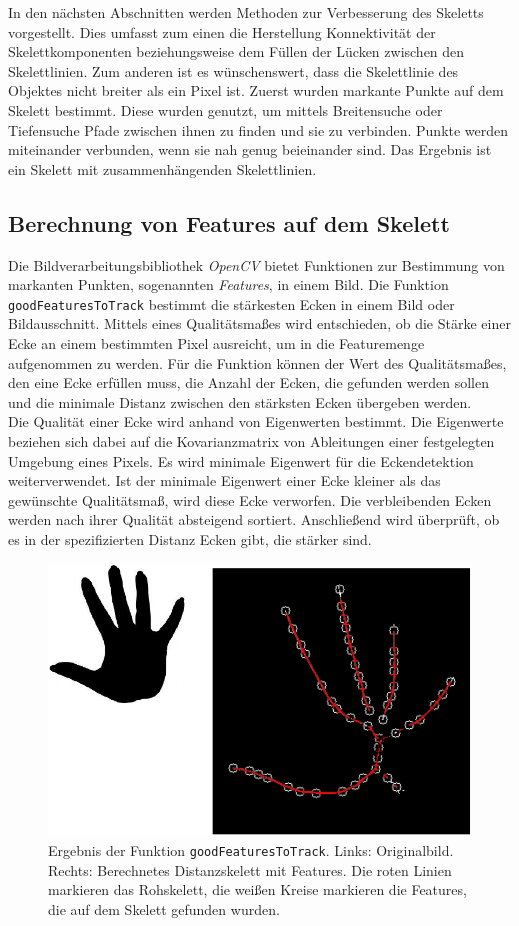 In den nächsten Abschnitten werden Methoden zur Verbesserung des Skeletts vorgestellt. Dies umfasst zum einen die Herstellung Konnektivität der Skelettkomponenten beziehungsweise dem Füllen der Lücken zwischen den Skelettlinien. Zum anderen ist es wünschenswert, dass die Skelettlinie des Objektes nicht breiter als ein Pixel ist. Zuerst wurden markante Punkte auf dem Skelett bestimmt. Diese wurden
genutzt, um mittels Breitensuche oder Tiefensuche Pfade zwischen ihnen zu finden und sie zu verbinden. Punkte werden miteinander
verbunden, wenn sie nah genug beieinander sind. Das Ergebnis ist ein Skelett mit
zusammenhängenden Skelettlinien. 
\subsection{Berechnung von Features auf dem Skelett}
\label{subsec:features}
Die Bildverarbeitungsbibliothek \emph{OpenCV} bietet Funktionen zur Bestimmung von markanten Punkten, sogenannten \emph{Features},
in einem Bild. Die Funktion \texttt{goodFeaturesToTrack} \cite{goodfeatures} bestimmt die stärkesten Ecken in einem Bild oder Bildausschnitt. Mittels eines Qualitätsmaßes wird entschieden, ob die Stärke einer
Ecke an einem bestimmten Pixel ausreicht, um in die Featuremenge aufgenommen zu werden. Für die
Funktion können der Wert des Qualitätsmaßes, den eine Ecke erfüllen muss, die Anzahl der Ecken, die gefunden werden sollen und die
minimale Distanz zwischen den stärksten Ecken übergeben werden.\\
Die Qualität einer Ecke wird anhand von Eigenwerten bestimmt. Die Eigenwerte beziehen sich dabei auf 
die Kovarianzmatrix von Ableitungen einer festgelegten Umgebung eines Pixels. Es wird minimale Eigenwert
für die Eckendetektion weiterverwendet. Ist der minimale Eigenwert einer Ecke kleiner als das gewünschte
Qualitätsmaß, wird diese Ecke verworfen. Die verbleibenden Ecken werden nach ihrer Qualität absteigend sortiert. Anschließend wird überprüft, ob es in der spezifizierten Distanz Ecken gibt, die stärker sind. 
\begin{figure}[htbp]
\centering
\includegraphics[width=0.7\linewidth]{./fig/features.pdf}
\caption{Ergebnis der Funktion \texttt{goodFeaturesToTrack}. Links: Originalbild. Rechts: Berechnetes Distanzskelett mit Features. Die roten Linien markieren das Rohskelett, die weißen Kreise markieren die Features, die auf dem Skelett gefunden wurden.}
\label{fig:features}
\end{figure}
